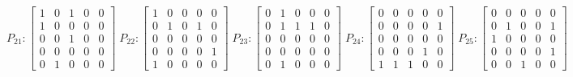     $$
        P_{21} : \begin{bmatrix}
            1 & 0 & 1 & 0 & 0 \\
            1 & 0 & 0 & 0 & 0 \\
            0 & 0 & 1 & 0 & 0 \\
            0 & 0 & 0 & 0 & 0 \\
            0 & 1 & 0 & 0 & 0
        \end{bmatrix}
        \;
         P_{22} : \begin{bmatrix}
            1 & 0 & 0 & 0 & 0 \\
            0 & 1 & 0 & 1 & 0 \\
            0 & 0 & 0 & 0 & 0 \\
            0 & 0 & 0 & 0 & 1 \\
            1 & 0 & 0 & 0 & 0
        \end{bmatrix}
        \;
        P_{23} : \begin{bmatrix}
            0 & 1 & 0 & 0 & 0 \\
            0 & 1 & 1 & 1 & 0 \\
            0 & 0 & 0 & 0 & 0 \\
            0 & 0 & 0 & 0 & 0 \\
            0 & 1 & 0 & 0 & 0
        \end{bmatrix}
        \; 
        P_{24} : \begin{bmatrix}
            0 & 0 & 0 & 0 & 0 \\
            0 & 0 & 0 & 0 & 1 \\
            0 & 0 & 0 & 0 & 0 \\
            0 & 0 & 0 & 1 & 0 \\
            1 & 1 & 1 & 0 & 0
        \end{bmatrix}
        \;
        P_{25} : \begin{bmatrix}
            0 & 0 & 0 & 0 & 0 \\
            0 & 1 & 0 & 0 & 1 \\
            1 & 0 & 0 & 0 & 0 \\
            0 & 0 & 0 & 0 & 1 \\
            0 & 0 & 1 & 0 & 0
        \end{bmatrix}
    $$

